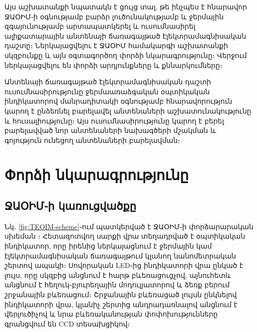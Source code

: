 \documentclass[12pt, fleqn]{report}
\begin{document}
Այս աշխատանքի նպատակն է ցույց տալ, թե ինչպես է հնարավոր ՋԱՕԻՄ֊ի օգնությամբ բարձր լուծունակությամբ և ջերմային զգայունությամբ արտապատկերել և ուսումնասիրել ալիքատարային անտենայի ճառագայթած էլեկտրամագնիսական դաշտը։ Ներկայացվելու է ՋԱՕԻՄ համակարգի աշխատանքի սկզբունքը և այն օգտագործող փորձի նկարագրությունը։ Վերջում ներկայացվելու են փորձի արդյունքները և քննարկումները։

Անտենայի ճառագայթած էլեկտրամագնիսական դաշտի ուսումնասիրությունը ջերմաառաձգական օպտիկական ինդիկատորով մանրադիտակի օգնությամբ հնարավորություն կարող է ընձեռնել բարելավել անտենաների աշխատունակությունը և հուսալիությունը։ Այս ուսումնասիրությունը կարող է բերել բարելավված նոր անտենաների նախագծերի մշակման և գոյություն ունեցող անտենաների բարելավման։

\newpage

\renewcommand{\thesection}{\arabic{section}}

\section{Փորձի նկարագրությունը}
\subsection{ՋԱՕԻՄ֊ի կառուցվածքը}

Նկ․ \ref{fig:TEOIM-scheme}֊ում պատկերված է ՋԱՕԻՄ֊ի փորձարարական սխեման \cite{arakelyan2016teoim}։ Հետազոտվող սարքի վրա տեղադրված է օպտիկական ինդիկատոր, որը իրենից ներկայացնում է ջերմային կամ էլեկտրամագնիսական ճառագայթում կլանող նանոմետրական շերտով ապակի։ Սովորական LED֊ից ինդիկատորի վրա ընկած է լույս, որը սկզբից անցնում է հարթ բևեռացուցչով, այնուհետև անցնում է հեղուկ֊բյուրեղային մոդուլյատորով և ձեռք բերում շրջանային բևեռացում։ Շրջանային բևեռացած լույսն ընկնելով ինդիկատորի վրա, կլանիչ շերտից անդրադառնալով անցնում է վերլուծիչով և նրա բևեռականության փոփոխությունները գրանցվում են CCD տեսախցիկով։
\end{document}
